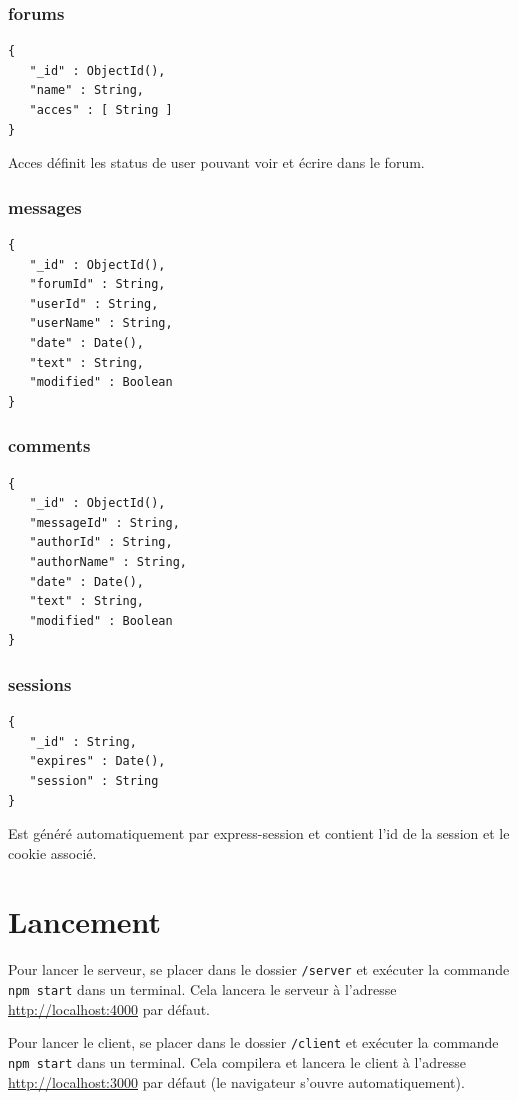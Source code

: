 \documentclass{article}
\begin{document}
\newpage

\subsubsection*{forums}
\begin{verbatim}
{
   "_id" : ObjectId(),
   "name" : String,
   "acces" : [ String ]
}
\end{verbatim}
Acces définit les status de user pouvant voir et écrire dans le forum.

\subsubsection*{messages}
\begin{verbatim}
{
   "_id" : ObjectId(),
   "forumId" : String,
   "userId" : String,
   "userName" : String,
   "date" : Date(),
   "text" : String,
   "modified" : Boolean
}
\end{verbatim}

\subsubsection*{comments}
\begin{verbatim}
{
   "_id" : ObjectId(),
   "messageId" : String,
   "authorId" : String,
   "authorName" : String,
   "date" : Date(),
   "text" : String,
   "modified" : Boolean
}
\end{verbatim}

\subsubsection*{sessions}
\begin{verbatim}
{
   "_id" : String,
   "expires" : Date(),
   "session" : String
}
\end{verbatim}
Est généré automatiquement par express-session et contient l'id de la session et le cookie associé.

\section{Lancement}
Pour lancer le serveur, se placer dans le dossier \texttt{/server} et exécuter la commande \texttt{npm start} dans un terminal. Cela lancera le serveur à l'adresse \url{http://localhost:4000} par défaut.

Pour lancer le client, se placer dans le dossier \texttt{/client} et exécuter la commande \texttt{npm start} dans un terminal. Cela compilera et lancera le client à l'adresse \url{http://localhost:3000} par défaut (le navigateur s'ouvre automatiquement).
\end{document}
